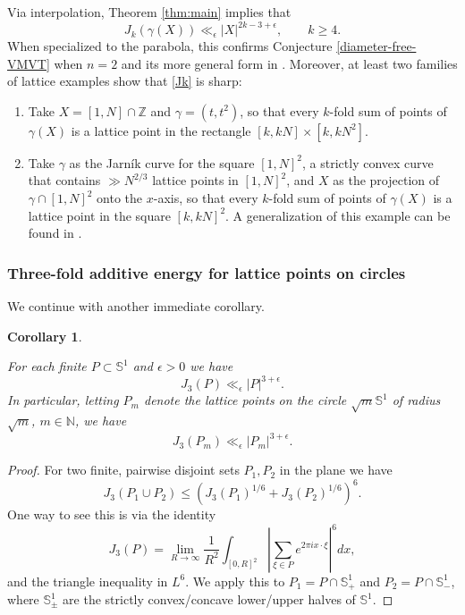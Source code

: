 \documentclass{amsart}
\numberwithin{equation}{section}
\newtheorem{corollary}[theorem]{Corollary}
\newcommand{\ZZ}{\mathbb{Z}}
\newcommand{\ZN}{\mathbb{N}}
\newcommand{\ZS}{\mathbb{S}}
\begin{document}
\medskip  

Via interpolation, Theorem \ref{thm:main} implies that  
\begin{equation}
    \label{Jk}
    J_k(\gamma(X))
    \ll_\epsilon
    |X|^{2k-3+\epsilon},
    \qquad k\geq 4.
\end{equation} 
When specialized to the parabola, this confirms Conjecture \ref{diameter-free-VMVT} when $n=2$ and its more general form in \cite[Question 2.13]{Bourgain-Demeter}.
Moreover, at least two families of lattice examples show that \eqref{Jk} is sharp:
\begin{enumerate}
    \item Take $X=[1,N]\cap\ZZ$ and $\gamma=(t, t^2)$, so that every $k$-fold sum of points of $\gamma(X)$ is a lattice point in the rectangle $[k,kN]\times[k,kN^2]$.
    \item Take $\gamma$ as the Jarn\'ik curve for the square $[1,N]^2$, a strictly convex curve that contains $\gg N^{2/3}$ lattice points in $[1,N]^2$, and $X$ as the projection of $\gamma\cap [1,N]^2$ onto the $x$-axis, so that every $k$-fold sum of points of $\gamma(X)$ is a lattice point in the square $[k,kN]^2$.
    A generalization of this example can be found in \cite[Section 6]{Cairo-Zhang}.
\end{enumerate}


\medskip  

\subsubsection{Three-fold additive energy for lattice points on circles}
\label{section-energy-circles}

We continue with another immediate corollary.
\begin{corollary}
\label{thm:maincircle}	

For each finite $P\subset \ZS^1$ and $\epsilon>0$ we have 
\[
    J_3(P)\ll_\epsilon |P|^{3+\epsilon}.
\]
In particular, letting $P_m$ denote the lattice points on the circle $\sqrt{m}\ZS^1$ of radius $\sqrt{m}$, $m\in \ZN$, we have
\begin{equation}
\label{eq:maincircle}
    J_3(P_m)\ll_\epsilon |P_m|^{3+\epsilon}.
\end{equation}	
\end{corollary}
\begin{proof}
For two finite, pairwise disjoint sets $P_1,P_2$ in the plane we have
\[
    J_3(P_1\cup P_2)\le (J_3(P_1)^{1/6}+J_3(P_2)^{1/6})^6.
\]
One way to see this is via the identity
\[
    J_3(P)=\lim_{R\to\infty}\frac1{R^2}\int_{[0,R]^2}|\sum_{\xi\in P}e^{2\pi ix\cdot \xi}|^6dx,
\]
and the triangle inequality in $L^6$. We apply this to $P_1=P\cap \ZS^1_+$ and $P_2=P\cap \ZS^1_-$, where $\ZS^{1}_{\pm}$ are the strictly convex/concave lower/upper halves of $\ZS^1$.
\end{proof}	
    
\end{document}
